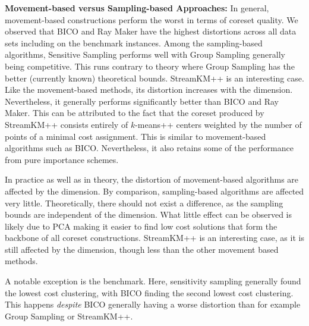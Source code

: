 {\bf Movement-based versus Sampling-based Approaches:}
In general, movement-based constructions perform the worst in terms of coreset quality. 
We observed that BICO and Ray Maker have the highest distortions across all data sets including on the benchmark instances. Among the sampling-based algorithms, Sensitive Sampling performs well with Group Sampling generally being competitive. This runs contrary to theory where Group Sampling has the better (currently known) theoretical bounds. StreamKM++ is an interesting case. Like the movement-based methods, its distortion increases with the dimension. Nevertheless, it generally performs significantly better than BICO and Ray Maker. This can be attributed to the fact that the coreset produced by StreamKM++ consists entirely of $k$-means++ centers weighted by the number of points of a minimal cost assignment. This is similar to movement-based algorithms such as BICO. Nevertheless, it also retains some of the performance from pure importance schemes.

In practice as well as in theory, the distortion of movement-based algorithms are affected by the dimension. By comparison, sampling-based algorithms are affected very little. Theoretically, there should not exist a difference, as the sampling bounds are independent of the dimension. What little effect can be observed is likely due to PCA making it easier to find low cost solutions that form the backbone of all coreset constructions. StreamKM++ is an interesting case, as it is still affected by the dimension, though less than the other movement based methods.

A notable exception is the benchmark. Here, sensitivity sampling generally found the lowest cost clustering, with BICO finding the second lowest cost clustering. 
This happens \emph{despite} BICO generally having a worse distortion than for example Group Sampling or StreamKM++.






